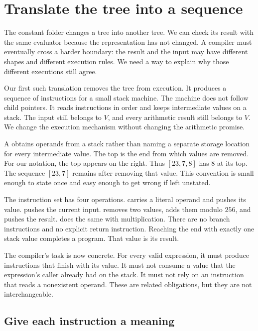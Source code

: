 \section{Translate the tree into a sequence}
\label{sec:tiny-stack-translation}

The constant folder changes a tree into another tree.
We can check its result with the same evaluator because the representation has not changed.
A compiler must eventually cross a harder boundary: the result and the input may have different shapes and different execution rules.
We need a way to explain why those different executions still agree.

Our first such translation removes the tree from execution.
It produces a sequence of instructions for a small stack machine.
The machine does not follow child pointers.
It reads instructions in order and keeps intermediate values on a stack.
The input still belongs to $V$, and every arithmetic result still belongs to $V$.
We change the execution mechanism without changing the arithmetic promise.

A  obtains operands from a stack rather than naming a separate storage location for every intermediate value.
The top is the end from which values are removed.
For our notation, the top appears on the right.
Thus $[23,7,8]$ has $8$ at its top.
The sequence $[23,7]$ remains after removing that value.
This convention is small enough to state once and easy enough to get wrong if left unstated.

The instruction set has four operations.
 carries a literal operand and pushes its value.
 pushes the current input.
 removes two values, adds them modulo $256$, and pushes the result.
 does the same with multiplication.
There are no branch instructions and no explicit return instruction.
Reaching the end with exactly one stack value completes a program.
That value is its result.

The compiler's task is now concrete.
For every valid expression, it must produce instructions that finish with its value.
It must not consume a value that the expression's caller already had on the stack.
It must not rely on an instruction that reads a nonexistent operand.
These are related obligations, but they are not interchangeable.

\subsection{Give each instruction a meaning}
\label{sec:tiny-stack-semantics}

